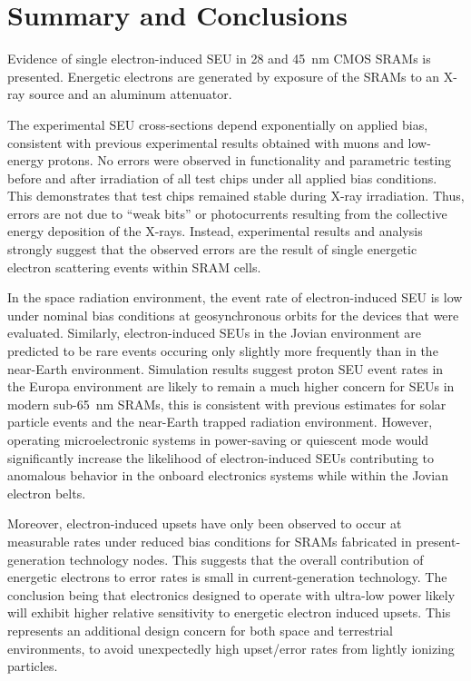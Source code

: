 \chapter{Summary and Conclusions} %
\label{cha:summary_and_conclusions}
Evidence of single electron-induced SEU in 28 and 45~nm CMOS SRAMs is presented. 
Energetic electrons are generated by exposure of the SRAMs to an X-ray source and an aluminum attenuator. 

The experimental SEU cross-sections depend exponentially on applied bias, consistent with previous experimental results obtained with muons and low-energy protons. 
No errors were observed in functionality and parametric testing before and after irradiation of all test chips under all applied bias conditions. 
This demonstrates that test chips remained stable during X-ray irradiation. 
Thus, errors are not due to ``weak bits'' or photocurrents resulting from the collective energy deposition of the X-rays. 
Instead, experimental results and analysis strongly suggest that the observed errors are the result of single energetic electron scattering events within SRAM cells. 

In the space radiation environment, the event rate of electron-induced SEU is low under nominal bias conditions at geosynchronous orbits for the devices that were evaluated. 
Similarly, electron-induced SEUs in the Jovian environment are predicted to be rare events occuring only slightly more frequently than in the near-Earth environment.
Simulation results suggest proton SEU event rates in the Europa environment are likely to remain a much higher concern for SEUs in modern sub-65~nm SRAMs, this is consistent with previous estimates for solar particle events and the near-Earth trapped radiation environment.
However, operating microelectronic systems in power-saving or quiescent mode would significantly increase the likelihood of electron-induced SEUs contributing to anomalous behavior in the onboard electronics systems while within the Jovian electron belts.

Moreover, electron-induced upsets have only been observed to occur at measurable rates under reduced bias conditions for SRAMs fabricated in present-generation technology nodes. 
This suggests that the overall contribution of energetic electrons to error rates is small in current-generation technology.
The conclusion being that electronics designed to operate with ultra-low power likely will exhibit higher relative sensitivity to energetic electron induced upsets. 
This represents an additional design concern for both space and terrestrial environments, to avoid unexpectedly high upset/error rates from lightly ionizing particles.

